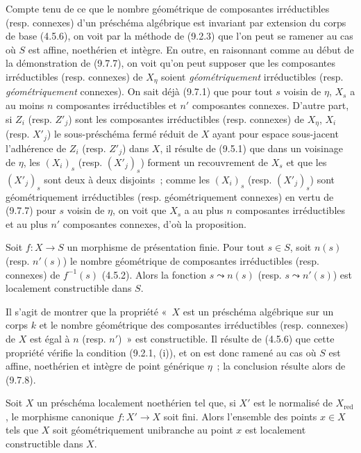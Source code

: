 Compte tenu de ce que le nombre géométrique de composantes irréductibles (resp.
connexes) d'un préschéma algébrique est invariant par extension du corps de
base (4.5.6), on voit par la méthode de (9.2.3) que l'on peut se ramener au cas
où $S$ est affine, noethérien et intègre. En outre, en raisonnant comme au début
de la démonstration de (9.7.7), on voit qu'on peut supposer que les composantes
irréductibles (resp. connexes) de $X_\eta$ soient \emph{géométriquement}
irréductibles (resp. \emph{géométriquement} connexes). On sait déjà (9.7.1) que
pour tout $s$ voisin de $\eta$, $X_s$ a au moins $n$ composantes irréductibles
et $n'$ composantes connexes. D'autre part, si $Z_i$ (resp. $Z'_j$) sont les
composantes irréductibles (resp. connexes) de $X_\eta$, $X_i$ (resp. $X'_j$) le
sous-préschéma fermé réduit de $X$ ayant pour espace sous-jacent l'adhérence de
$Z_i$ (resp. $Z'_j$) dans $X$, il résulte de (9.5.1) que dans un voisinage de
$\eta$, les $(X_i)_s$ (resp. $(X'_j)_s$) forment un recouvrement de $X_s$ et que
les $(X'_j)_s$ sont deux à deux disjoints~; comme les $(X_i)_s$ (resp.
$(X'_j)_s$) sont géométriquement irréductibles (resp. géométriquement connexes)
en vertu de (9.7.7) pour $s$ voisin de $\eta$, on voit que $X_s$ a au plus $n$
composantes irréductibles et au plus $n'$ composantes connexes, d'où la
proposition.

\begin{corollary}[9.7.9]
\label{IV.9.7.9-fr}
Soit $f:X\to S$ un morphisme de présentation finie. Pour tout $s\in S$, soit
$n(s)$ \textup{(resp. $n'(s)$)} le nombre géométrique de composantes irréductibles
\textup{(resp.} connexes\textup{)} de $f^{-1}(s)$ \textup{(4.5.2)}. Alors la fonction $s\leadsto n(s)$
\textup{(resp. $s\leadsto n'(s)$)} est localement constructible dans $S$.
\end{corollary}

Il s'agit de montrer que la propriété «~$X$ est un préschéma algébrique sur un
corps $k$ et le nombre géométrique des composantes irréductibles (resp.
connexes) de $X$ est égal à $n$ (resp. $n'$)~» est constructible. Il résulte de
(4.5.6) que cette propriété vérifie la condition (9.2.1, (i)), et on est donc
ramené au cas où $S$ est affine, noethérien et intègre de point générique
$\eta$~; la conclusion résulte alors de (9.7.8).

\begin{corollary}[9.7.10]
\label{IV.9.7.10-fr}
Soit $X$ un préschéma localement noethérien tel que, si $X'$ est le normalisé de
$X_{\mathrm{red}}$, le morphisme canonique $f:X'\to X$ soit fini. Alors
l'ensemble des points $x\in X$ tels que $X$ soit géométriquement unibranche au
point $x$ est localement constructible dans $X$.
\end{corollary}

